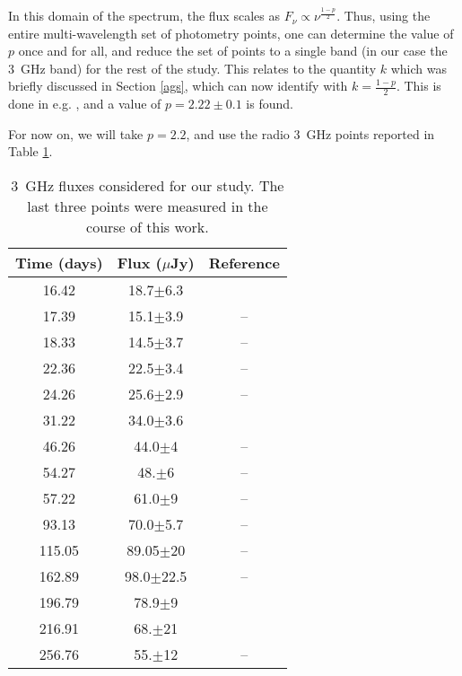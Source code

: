 In this domain of the spectrum, the flux scales as $F_\nu \propto \nu^{\frac{1 - p}{2}}$. Thus, using the entire multi-wavelength set of photometry points, one can determine the value of $p$ once and for all, and reduce the set of points to a single band (in our case the 3~GHz band) for the rest of the study. This relates to the quantity $k$ which was briefly discussed in Section \ref{ags}, which can now identify with $k = \frac{1 - p}{2}$. This is done in e.g. \cite{5}, and a value of $p = 2.22\pm0.1$ is found.

For now on, we will take $p = 2.2$, and use the radio 3~GHz points reported in Table \ref{radio}.

\begin{table}
\begin{center}
\begin{tabular}{c|c|c}
\bf{Time (days)} & \bf{Flux ($\mu$Jy)} & \bf{Reference}\\
\hline
16.42 & 18.7$\pm$6.3 & \cite{12}\\
17.39 & 15.1$\pm$3.9 & --\\
18.33 & 14.5$\pm$3.7 & --\\
22.36 & 22.5$\pm$3.4 & --\\
24.26 &  25.6$\pm$2.9 & --\\
31.22 & 34.0$\pm$3.6 & \cite{5}\\
46.26 & 44.0$\pm$4 & --\\
54.27 &  48.$\pm$6 & --\\
57.22 & 61.0$\pm$9 & --\\
93.13 & 70.0$\pm$5.7 & --\\
115.05 & 89.05$\pm$20 & --\\
162.89 & 98.0$\pm$22.5 & --\\
196.79 & 78.9$\pm$9 & \cite{10}\\
216.91 & 68.$\pm$21 & \cite{17}\\
256.76 & 55.$\pm$12 & -- \\


\end{tabular}
\caption{3~GHz fluxes considered for our study. The last three points were measured in the course of this work.}
\label{radio}
\end{center}
\end{table}

